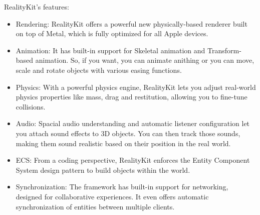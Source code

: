 RealityKit’s features:
\begin{itemize}
    \item Rendering: RealityKit offers a powerful new physically-based renderer built on top of Metal, which is fully optimized for all Apple devices.

    \item Animation: It has built-in support for Skeletal animation and Transform-based animation. So, if you want, you can animate anithing or you can move, scale and rotate objects with various easing functions.

    \item Physics: With a powerful physics engine, RealityKit lets you adjust real-world physics properties like mass, drag and restitution, allowing you to fine-tune collisions.

    \item Audio: Spacial audio understanding and automatic listener configuration let you attach sound effects to 3D objects. You can then track those sounds, making them sound realistic based on their position in the real world.

    \item ECS: From a coding perspective, RealityKit enforces the Entity Component System design pattern to build objects within the world.

    \item Synchronization: The framework has built-in support for networking, designed for collaborative experiences. It even offers automatic synchronization of entities between multiple clients.
\end{itemize}
